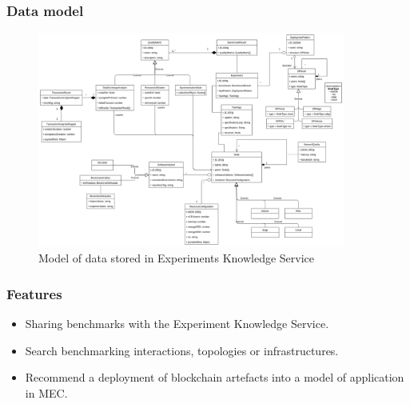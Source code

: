 \documentclass{beamer}
\begin{document}
	\begin{frame}
		\frametitle{Data model}
		\begin{figure}[h]
		\centering
			\includegraphics[width=0.9\textwidth]{figures/benchmarked_experiment_data_model_portrain.png}
			\vspace{-0.5cm}
			\caption{Model of data stored in Experiments Knowledge Service}
			\label{fig:benchmarked_experiment_model}
		\end{figure}
	\end{frame}

	\begin{frame}
		\frametitle{Features}
		
	
		\begin{itemize}
			\item Sharing benchmarks with the Experiment Knowledge Service.
			\item Search benchmarking interactions, topologies or infrastructures.
			\item Recommend a deployment of blockchain artefacts into a model of application in \gls{MEC}.
		\end{itemize}
	
	\end{frame}
	
\end{document}
